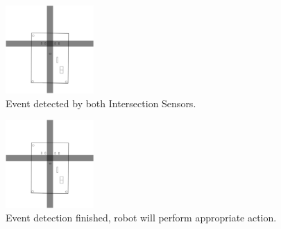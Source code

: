 \begin{multicols}{2}

\begin{figure}[H]
\centering
\includegraphics[width=0.3\textwidth]{figures/intersection-1.png}
\caption{Event detected by both Intersection Sensors.}
\end{figure}

\begin{figure}[H]
\centering
\includegraphics[width=0.3\textwidth]{figures/intersection-2.png}
\caption{Event detection finished, robot will perform appropriate action.}
\end{figure}

\end{multicols}

